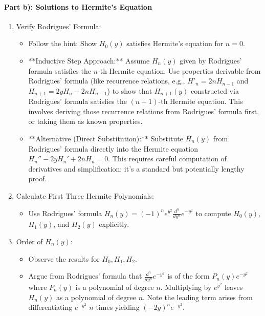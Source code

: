 \documentclass[10pt]{article}
\begin{document}
\paragraph{Part b): Solutions to Hermite's Equation}
\begin{enumerate}
    \item Verify Rodrigues' Formula:
        \begin{itemize}
            \item Follow the hint: Show \(H_0(y)\) satisfies Hermite's equation for \(n=0\).
            \item **Inductive Step Approach:** Assume \(H_n(y)\) given by Rodrigues' formula satisfies the \(n\)-th Hermite equation. Use properties derivable from Rodrigues' formula (like recurrence relations, e.g., \(H'_{n} = 2nH_{n-1}\) and \(H_{n+1}=2yH_n - 2nH_{n-1}\)) to show that \(H_{n+1}(y)\) constructed via Rodrigues' formula satisfies the \((n+1)\)-th Hermite equation. This involves deriving those recurrence relations from Rodrigues' formula first, or taking them as known properties.
            \item **Alternative (Direct Substitution):** Substitute \(H_n(y)\) from Rodrigues' formula directly into the Hermite equation \(H_n'' - 2yH_n' + 2nH_n = 0\). This requires careful computation of derivatives and simplification; it's a standard but potentially lengthy proof.
        \end{itemize}
    \item Calculate First Three Hermite Polynomials:
        \begin{itemize}
            \item Use Rodrigues' formula \(H_n(y) = (-1)^n e^{y^2} \frac{d^n}{dy^n} e^{-y^2}\) to compute \(H_0(y)\), \(H_1(y)\), and \(H_2(y)\) explicitly.
        \end{itemize}
    \item Order of \(H_n(y)\):
        \begin{itemize}
            \item Observe the results for \(H_0, H_1, H_2\).
            \item Argue from Rodrigues' formula that \(\frac{d^n}{dy^n} e^{-y^2}\) is of the form \(P_n(y)e^{-y^2}\) where \(P_n(y)\) is a polynomial of degree \(n\). Multiplying by \(e^{y^2}\) leaves \(H_n(y)\) as a polynomial of degree \(n\). Note the leading term arises from differentiating \(e^{-y^2}\) \(n\) times yielding \( (-2y)^n e^{-y^2} \).
        \end{itemize}
\end{enumerate}
\end{document}

